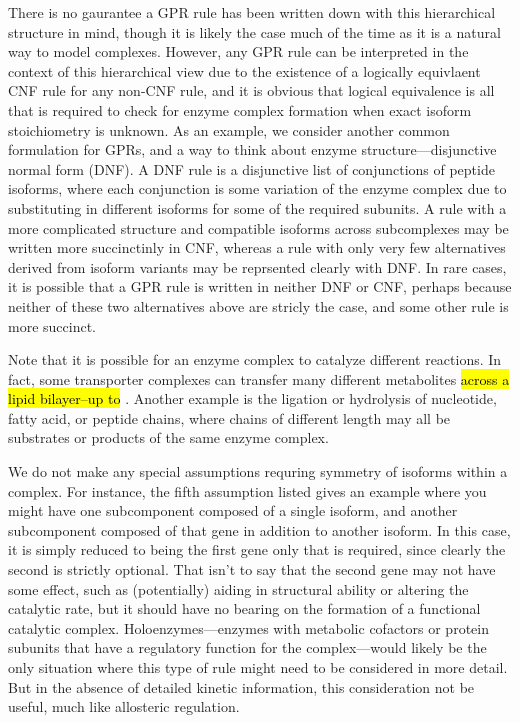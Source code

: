 \documentclass[phd,tocprelim]{cornell}
\theoremstyle{break}
\begin{document}
There is no gaurantee a GPR rule has been written down with this
hierarchical structure in mind, though it is likely the case much of
the time as it is a natural way to model complexes.  However, any GPR
rule can be interpreted in the context of this hierarchical view due
to the existence of a logically equivlaent CNF rule for any non-CNF
rule, and it is obvious that logical equivalence is all that is
required to check for enzyme complex formation when exact isoform
stoichiometry is unknown.  As an example, we consider another common
formulation for GPRs, and a way to think about enzyme
structure---disjunctive normal form (DNF).  A DNF rule is a
disjunctive list of conjunctions of peptide isoforms, where each
conjunction is some variation of the enzyme complex due to
substituting in different isoforms for some of the required
subunits. A rule with a more complicated structure and compatible
isoforms across subcomplexes may be written more succinctinly in CNF,
whereas a rule with only very few alternatives derived from isoform
variants may be reprsented clearly with DNF.  In rare cases, it is
possible that a GPR rule is written in neither DNF or CNF, perhaps
because neither of these two alternatives above are stricly the case,
and some other rule is more succinct.

Note that it is possible for an enzyme complex to catalyze different
reactions. In fact, some transporter complexes can transfer many
different metabolites \hl{across a lipid bilayer--up to} . Another
example is the ligation or hydrolysis of nucleotide, fatty acid, or
peptide chains, where chains of different length may all be substrates
or products of the same enzyme complex.

We do not make any special assumptions requring symmetry of
isoforms within a complex. For instance, the fifth
assumption listed gives an example where you might have one
subcomponent composed of a single isoform, and another subcomponent
composed of that gene in addition to another isoform. In this case, it
is simply reduced to being the first gene only that is required, since
clearly the second is strictly optional. That isn't to say that the
second gene may not have some effect, such as (potentially) aiding in
structural ability or altering the catalytic rate, but it should have
no bearing on the formation of a functional catalytic
complex. Holoenzymes---enzymes with metabolic cofactors or protein
subunits that have a regulatory function for the complex---would
likely be the only situation where this type of rule might need to be
considered in more detail. But in the absence of detailed kinetic
information, this consideration not be useful, much like allosteric
regulation.
\end{document}
